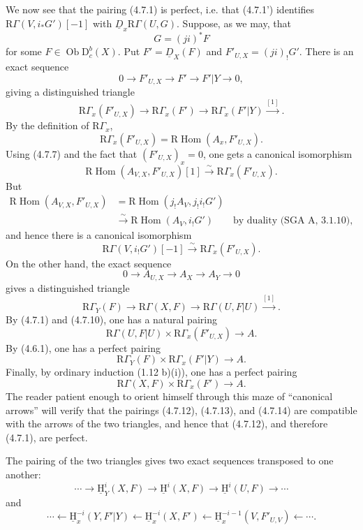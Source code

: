 \documentclass[12pt]{article}
\newcommand{\Hom}{\operatorname{Hom}}
\newcommand{\ob}{\operatorname{Ob}}
\newcommand{\D}{\mathrm D}
\newcommand{\R}{\mathrm R}
\newcommand{\uH}{\underline{\mathrm H}}
\begin{document}
We now see that the pairing (4.7.1) is perfect, i.e. that (4.7.1') identifies $\R\Gamma(V,i_*G')[-1]$ with $\underline D_x\R\Gamma(U,G)$. Suppose, as we may, that
\[
   G=(ji)^*F
\]
for some $F\in\ob\D_c^b(X)$. Put $F'=\underline D_X(F)$ and $F'_{U,X}=(ji)_!G'$. There is an exact sequence
\[
   0\longrightarrow F'_{U,X}\longrightarrow F'
      \longrightarrow F'|Y\longrightarrow0,\tag{4.7.9}
\]
giving a distinguished triangle
\[
   \R\Gamma_x(F'_{U,X})\to \R\Gamma_x(F')\to
      \R\Gamma_x(F'|Y)\xrightarrow{[1]}.
\]
By the definition of $\R\Gamma_x$,
\[
   \R\Gamma_x(F'_{U,X})=\R\Hom(A_x,F'_{U,X}).
\]
Using (4.7.7) and the fact that $(F'_{U,X})_x=0$, one gets a canonical isomorphism
\[
   \R\Hom(A_{V,X},F'_{U,X})[1]
      \xrightarrow{\sim}\R\Gamma_x(F'_{U,X}).
\]
But
\[
\begin{aligned}
\R\Hom(A_{V,X},F'_{U,X})
&=\R\Hom(j_!A_V,j_!i_!G')\\
&\xrightarrow{\sim}\R\Hom(A_V,i_!G')
     \qquad\text{by duality (SGA A, 3.1.10)},
\end{aligned}
\]
and hence there is a canonical isomorphism
\[
   \R\Gamma(V,i_!G')[-1]
      \xrightarrow{\sim}\R\Gamma_x(F'_{U,X}).\tag{4.7.10}
\]
On the other hand, the exact sequence
\[
   0\longrightarrow A_{U,X}\longrightarrow A_X\longrightarrow A_Y\longrightarrow0\tag{4.7.11}
\]
gives a distinguished triangle
\[
   \R\Gamma_Y(F)\to \R\Gamma(X,F)\to
   \R\Gamma(U,F|U)\xrightarrow{[1]}.
\]
By (4.7.1) and (4.7.10), one has a natural pairing
\[
   \R\Gamma(U,F|U)\times \R\Gamma_x(F'_{U,X})\longrightarrow A.\tag{4.7.12}
\]
By (4.6.1), one has a perfect pairing
\[
   \R\Gamma_Y(F)\times \R\Gamma_x(F'|Y)\longrightarrow A.\tag{4.7.13}
\]
Finally, by ordinary induction (1.12 b)(i)), one has a perfect pairing
\[
   \R\Gamma(X,F)\times \R\Gamma_x(F')\longrightarrow A.\tag{4.7.14}
\]
The reader patient enough to orient himself through this maze of ``canonical arrows'' will verify that the pairings (4.7.12), (4.7.13), and (4.7.14) are compatible with the arrows of the two triangles, and hence that (4.7.12), and therefore (4.7.1), are perfect.

The pairing of the two triangles gives two exact sequences transposed to one another:
\[
   \cdots\to \uH^i_Y(X,F)\to \uH^i(X,F)\to \uH^i(U,F)\to\cdots
\]
and
\[
   \cdots\leftarrow \uH^{-i}_x(Y,F'|Y)
      \leftarrow \uH^{-i}_x(X,F')
      \leftarrow \uH^{-i-1}_x(V,F'_{U,V})\leftarrow\cdots.
\]
\end{document}
